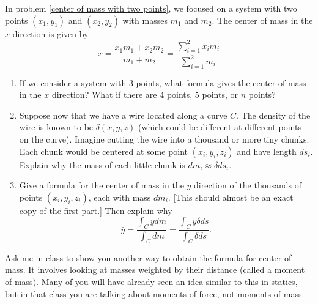 \begin{problem}\label{center of mass of curve}%
%
In problem \ref{center of mass with two points}, we focused on a system with two points $(x_1,y_1)$ and $(x_2,y_2)$ with masses $m_1$ and $m_2$. The center of mass in the $x$ direction is given by  
$$
\bar x = \frac{x_1m_1+x_2m_2}{m_1+m_2} = \frac{\sum_{i=1}^2x_i m_i}{\sum_{i=1}^2m_i}$$
\begin{enumerate}
\item If we consider a system with 3 points, what formula gives the center of mass in the $x$ direction? What if there are 4 points, 5 points, or $n$ points?  
 \item Suppose now that we have a wire located along a curve $C$. The density of the wire is known to be $\delta(x,y,z)$ (which could be different at different points on the curve).  Imagine cutting the wire into a thousand or more tiny chunks.  Each chunk would be centered at some point $(x_i,y_i,z_i)$ and have length $ds_i$. Explain why the mass of each little chunk is $dm_i\approx\delta ds_i$. 
 \item Give a formula for the center of mass in the $y$ direction of the thousands of points $(x_i,y_i,z_i)$, each with mass $dm_i$. [This should almost be an exact copy of the first part.] 
 Then explain why $$\bar y = \frac{\int_C y dm}{\int_C dm}=\frac{\int_C y \delta ds}{\int_C \delta ds}.$$
\end{enumerate}
\end{problem}

Ask me in class to show you another way to obtain the formula for center of mass. It involves looking at masses weighted by their distance (called a moment of mass).  Many of you will have already seen an idea similar to this in statics, but in that class you are talking about moments of force, not moments of mass. 


